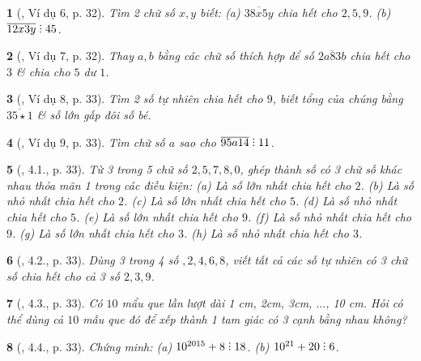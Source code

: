\documentclass{article}
\newtheorem{baitoan}{}
\DeclareRobustCommand{\divby}{%
	\mathrel{\vbox{\baselineskip.65ex\lineskiplimit0pt\hbox{.}\hbox{.}\hbox{.}}}%
}
\begin{document}
\begin{baitoan}[\cite{Binh_boi_duong_Toan_6_tap_1}, Ví dụ 6, p. 32]
	Tìm 2 chữ số $x,y$ biết: (a) $\overline{38x5y}$ chia hết cho $2,5,9$. (b) $\overline{12x3y}\divby45$.
\end{baitoan}

\begin{baitoan}[\cite{Binh_boi_duong_Toan_6_tap_1}, Ví dụ 7, p. 32]
	Thay $a,b$ bằng các chữ số thích hợp để số $ \overline{2a83b}$ chia hết cho $3$ \& chia cho $5$ dư $1$.
\end{baitoan}

\begin{baitoan}[\cite{Binh_boi_duong_Toan_6_tap_1}, Ví dụ 8, p. 33]
	Tìm 2 số tự nhiên chia hết cho $9$, biết tổng của chúng bằng $\overline{35\star1}$ \& số lớn gấp đôi số bé.
\end{baitoan}

\begin{baitoan}[\cite{Binh_boi_duong_Toan_6_tap_1}, Ví dụ 9, p. 33]
	Tìm chữ số $a$ sao cho $\overline{95a14}\divby11$.
\end{baitoan}

\begin{baitoan}[\cite{Binh_boi_duong_Toan_6_tap_1}, 4.1., p. 33]
	Từ 3 trong 5 chữ số $2,5,7,8,0$, ghép thành số có 3 chữ số khác nhau thỏa mãn 1 trong các điều kiện: (a) Là số lớn nhất chia hết cho $2$. (b) Là số nhỏ nhất chia hết cho $2$. (c) Là số lớn nhất chia hết cho $5$. (d) Là số nhỏ nhất chia hết cho $5$. (e) Là số lớn nhất chia hết cho $9$. (f) Là số nhỏ nhất chia hết cho $9$. (g) Là số lớn nhất chia hết cho $3$. (h) Là số nhỏ nhất chia hết cho $3$.
\end{baitoan}

\begin{baitoan}[\cite{Binh_boi_duong_Toan_6_tap_1}, 4.2., p. 33]
	Dùng 3 trong 4 số $,2,4,6,8$, viết tất cả các số tự nhiên có 3 chữ số chia hết cho cả 3 số $2,3,9$.
\end{baitoan}

\begin{baitoan}[\cite{Binh_boi_duong_Toan_6_tap_1}, 4.3., p. 33]
	Có $10$ mẩu que lần lượt dài {\rm1 cm, 2cm, 3cm, $\ldots$, 10 cm}. Hỏi có thể dùng cả $10$ mẫu que đó để xếp thành 1 tam giác có 3 cạnh bằng nhau không?
\end{baitoan}

\begin{baitoan}[\cite{Binh_boi_duong_Toan_6_tap_1}, 4.4., p. 33]
	Chứng minh: (a) $10^{2015} + 8\divby18$. (b) $10^{21} + 20\divby6$.
\end{baitoan}
\end{document}
